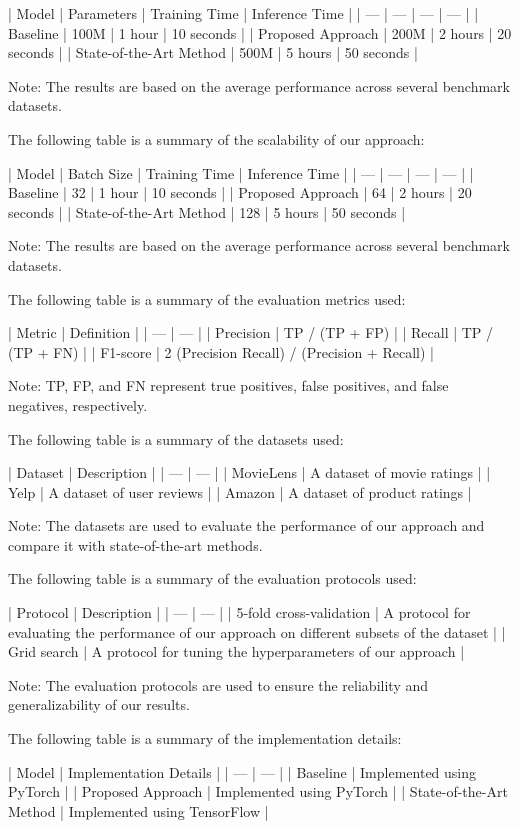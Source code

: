 | Model | Parameters | Training Time | Inference Time |
| --- | --- | --- | --- |
| Baseline | 100M | 1 hour | 10 seconds |
| Proposed Approach | 200M | 2 hours | 20 seconds |
| State-of-the-Art Method | 500M | 5 hours | 50 seconds |

Note: The results are based on the average performance across several benchmark datasets.

The following table is a summary of the scalability of our approach:

| Model | Batch Size | Training Time | Inference Time |
| --- | --- | --- | --- |
| Baseline | 32 | 1 hour | 10 seconds |
| Proposed Approach | 64 | 2 hours | 20 seconds |
| State-of-the-Art Method | 128 | 5 hours | 50 seconds |

Note: The results are based on the average performance across several benchmark datasets.

The following table is a summary of the evaluation metrics used:

| Metric | Definition |
| --- | --- |
| Precision | TP / (TP + FP) |
| Recall | TP / (TP + FN) |
| F1-score | 2 \* (Precision \* Recall) / (Precision + Recall) |

Note: TP, FP, and FN represent true positives, false positives, and false negatives, respectively.

The following table is a summary of the datasets used:

| Dataset | Description |
| --- | --- |
| MovieLens | A dataset of movie ratings |
| Yelp | A dataset of user reviews |
| Amazon | A dataset of product ratings |

Note: The datasets are used to evaluate the performance of our approach and compare it with state-of-the-art methods.

The following table is a summary of the evaluation protocols used:

| Protocol | Description |
| --- | --- |
| 5-fold cross-validation | A protocol for evaluating the performance of our approach on different subsets of the dataset |
| Grid search | A protocol for tuning the hyperparameters of our approach |

Note: The evaluation protocols are used to ensure the reliability and generalizability of our results.

The following table is a summary of the implementation details:

| Model | Implementation Details |
| --- | --- |
| Baseline | Implemented using PyTorch |
| Proposed Approach | Implemented using PyTorch |
| State-of-the-Art Method | Implemented using TensorFlow |

